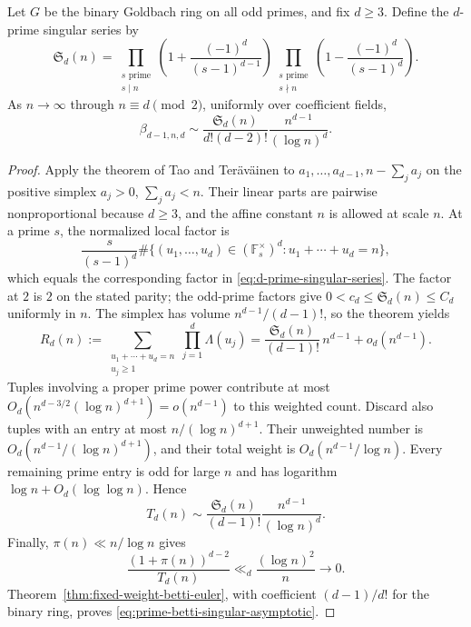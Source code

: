 \begin{corollary}\label{cor:prime-betti-singular-series}
Let $G$ be the binary Goldbach ring on all odd primes, and fix $d\ge3$.
Define the $d$-prime singular series by
\begin{equation}\label{eq:d-prime-singular-series}
 \mathfrak S_d(n)=
 \prod_{\substack{s\text{ prime}\\s\mid n}}
       \left(1+\frac{(-1)^d}{(s-1)^{d-1}}\right)
 \prod_{\substack{s\text{ prime}\\s\nmid n}}
       \left(1-\frac{(-1)^d}{(s-1)^d}\right).
\end{equation}
As $n\to\infty$ through $n\equiv d\pmod2$, uniformly over coefficient fields,
\begin{equation}\label{eq:prime-betti-singular-asymptotic}
 \beta_{d-1,n,d}
 \sim\frac{\mathfrak S_d(n)}{d!(d-2)!}
             \frac{n^{d-1}}{(\log n)^d}.
\end{equation}
\end{corollary}
\begin{proof}
Apply the theorem of Tao and Ter\"av\"ainen
\cite[Theorem~1.6]{TT} to
$a_1,\ldots,a_{d-1},n-\sum_j a_j$ on the positive simplex
$a_j>0$, $\sum_j a_j<n$. Their linear parts are pairwise
nonproportional because $d\ge3$, and the affine constant $n$ is
allowed at scale $n$. At a prime $s$, the normalized local factor is
\[
 \frac{s}{(s-1)^d}
 \#\{(u_1,\ldots,u_d)\in(\mathbb F_s^\times)^d:
                                      u_1+\cdots+u_d=n\},
\]
which equals the corresponding factor in
\eqref{eq:d-prime-singular-series}. The factor at $2$ is $2$ on the
stated parity; the odd-prime factors give
$0<c_d\le\mathfrak S_d(n)\le C_d$ uniformly in $n$.
The simplex has volume $n^{d-1}/(d-1)!$, so the theorem yields
\[
 R_d(n):=\sum_{\substack{u_1+\cdots+u_d=n\\u_j\ge1}}
              \prod_{j=1}^d\Lambda(u_j)
 =\frac{\mathfrak S_d(n)}{(d-1)!}\,n^{d-1}+o_d(n^{d-1}).
\]
Tuples involving a proper prime power contribute at most
$O_d(n^{d-3/2}(\log n)^{d+1})=o(n^{d-1})$ to this weighted count.
Discard also tuples with an entry at most $n/(\log n)^{d+1}$.
Their unweighted number is $O_d(n^{d-1}/(\log n)^{d+1})$, and their
total weight is $O_d(n^{d-1}/\log n)$. Every remaining prime entry
is odd for large $n$ and has logarithm
$\log n+O_d(\log\log n)$. Hence
\begin{equation}\label{eq:d-prime-count-asymptotic}
 T_d(n)\sim\frac{\mathfrak S_d(n)}{(d-1)!}
                    \frac{n^{d-1}}{(\log n)^d}.
\end{equation}
Finally, $\pi(n)\ll n/\log n$ gives
\[
 \frac{(1+\pi(n))^{d-2}}{T_d(n)}
       \ll_d\frac{(\log n)^2}{n}\longrightarrow0.
\]
Theorem~\ref{thm:fixed-weight-betti-euler}, with coefficient
$(d-1)/d!$ for the binary ring, proves
\eqref{eq:prime-betti-singular-asymptotic}.
\end{proof}

